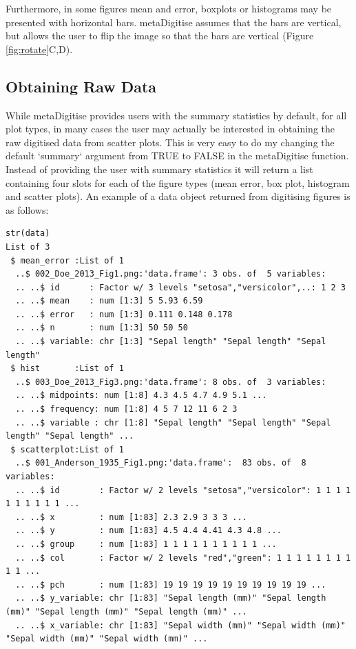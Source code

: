 \documentclass{article}
\begin{document}
Furthermore, in some figures mean and error, boxplots or histograms may be presented with horizontal bars. metaDigitise assumes that the bars are vertical, but allows the user to flip the image so that the bars are vertical (Figure \ref{fig:rotate}C,D).

\subsection{Obtaining Raw Data}

While metaDigitise provides users with the summary statistics by default, for all plot types, in many cases the user may actually be interested in obtaining the raw digitised data from scatter plots. This is very easy to do my changing the default `summary` argument from TRUE to FALSE in the metaDigitise function. Instead of providing the user with summary statistics it will return a list containing four slots for each of the figure types (mean error, box plot, histogram and scatter plots). An example of a data object returned from digitising figures is as follows:

\begin{verbatim}
str(data)
List of 3
 $ mean_error :List of 1
  ..$ 002_Doe_2013_Fig1.png:'data.frame': 3 obs. of  5 variables:
  .. ..$ id      : Factor w/ 3 levels "setosa","versicolor",..: 1 2 3
  .. ..$ mean    : num [1:3] 5 5.93 6.59
  .. ..$ error   : num [1:3] 0.111 0.148 0.178
  .. ..$ n       : num [1:3] 50 50 50
  .. ..$ variable: chr [1:3] "Sepal length" "Sepal length" "Sepal length"
 $ hist       :List of 1
  ..$ 003_Doe_2013_Fig3.png:'data.frame': 8 obs. of  3 variables:
  .. ..$ midpoints: num [1:8] 4.3 4.5 4.7 4.9 5.1 ...
  .. ..$ frequency: num [1:8] 4 5 7 12 11 6 2 3
  .. ..$ variable : chr [1:8] "Sepal length" "Sepal length" "Sepal length" "Sepal length" ...
 $ scatterplot:List of 1
  ..$ 001_Anderson_1935_Fig1.png:'data.frame':  83 obs. of  8 variables:
  .. ..$ id        : Factor w/ 2 levels "setosa","versicolor": 1 1 1 1 1 1 1 1 1 1 ...
  .. ..$ x         : num [1:83] 2.3 2.9 3 3 3 ...
  .. ..$ y         : num [1:83] 4.5 4.4 4.41 4.3 4.8 ...
  .. ..$ group     : num [1:83] 1 1 1 1 1 1 1 1 1 1 ...
  .. ..$ col       : Factor w/ 2 levels "red","green": 1 1 1 1 1 1 1 1 1 1 ...
  .. ..$ pch       : num [1:83] 19 19 19 19 19 19 19 19 19 19 ...
  .. ..$ y_variable: chr [1:83] "Sepal length (mm)" "Sepal length (mm)" "Sepal length (mm)" "Sepal length (mm)" ...
  .. ..$ x_variable: chr [1:83] "Sepal width (mm)" "Sepal width (mm)" "Sepal width (mm)" "Sepal width (mm)" ...
\end{verbatim}
\end{document}
